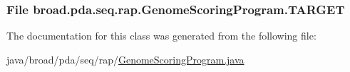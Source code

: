 \hypertarget{classbroad_1_1pda_1_1seq_1_1rap_1_1_genome_scoring_program_aac4fb950639684f61c7af1cc2e01330c}{
\subsubsection[{T\+A\+R\+G\+E\+T}]{\setlength{\rightskip}{0pt plus 5cm}File broad.\+pda.\+seq.\+rap.\+Genome\+Scoring\+Program.\+T\+A\+R\+G\+E\+T}}\label{classbroad_1_1pda_1_1seq_1_1rap_1_1_genome_scoring_program_aac4fb950639684f61c7af1cc2e01330c}


The documentation for this class was generated from the following file\+:\begin{DoxyCompactItemize}
\item 
java/broad/pda/seq/rap/\hyperlink{_genome_scoring_program_8java}{Genome\+Scoring\+Program.\+java}\end{DoxyCompactItemize}
